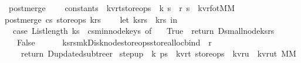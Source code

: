 \begin{isabellebody}
\isanewline
\isanewline
\isanewline
\isanewline
\isanewline
\isanewline
\isanewline
\isanewline
\isanewline
\isanewline
\isanewline
\isanewline
{}\isamarkupfalse%
\ post{\isacharunderscore}merge\ {\isacharcolon}{\isacharcolon}\ \isanewline
\ \ {\isachardoublequoteopen}constants\ {\isasymRightarrow}\ {\isacharparenleft}{\isacharprime}k{\isacharcomma}{\isacharprime}v{\isacharcomma}{\isacharprime}r{\isacharcomma}{\isacharprime}t{\isacharparenright}store{\isacharunderscore}ops\ {\isasymRightarrow}\ {\isacharparenleft}{\isacharprime}k\ s\ {\isacharasterisk}\ {\isacharprime}r\ s{\isacharparenright}\ {\isasymRightarrow}\ {\isacharparenleft}{\isacharparenleft}{\isacharprime}k{\isacharcomma}{\isacharprime}v{\isacharcomma}{\isacharprime}r{\isacharparenright}fo{\isacharcomma}{\isacharprime}t{\isacharparenright}MM{\isachardoublequoteclose}\isanewline
{}\isanewline
{\isachardoublequoteopen}post{\isacharunderscore}merge\ cs\ store{\isacharunderscore}ops\ krs\ {\isacharequal}\ {\isacharparenleft}\isanewline
\ \ let\ {\isacharparenleft}ks{\isacharcomma}rs{\isacharparenright}\ {\isacharequal}\ krs\ in\isanewline
\ \ case\ List{\isachardot}length\ ks\ {\isacharless}\ cs{\isacharbar}{\isachargreater}min{\isacharunderscore}node{\isacharunderscore}keys\ of\ \isanewline
\ \ True\ {\isasymRightarrow}\ {\isacharparenleft}return\ {\isacharparenleft}D{\isacharunderscore}small{\isacharunderscore}node{\isacharparenleft}ks{\isacharcomma}rs{\isacharparenright}{\isacharparenright}{\isacharparenright}\isanewline
\ \ {\isacharbar}\ False\ {\isasymRightarrow}\ {\isacharparenleft}\isanewline
\ \ \ \ {\isacharparenleft}ks{\isacharcomma}rs{\isacharparenright}{\isacharbar}{\isachargreater}mk{\isacharunderscore}Disk{\isacharunderscore}node{\isacharbar}{\isachargreater}{\isacharparenleft}store{\isacharunderscore}ops{\isacharbar}{\isachargreater}store{\isacharunderscore}alloc{\isacharparenright}{\isacharbar}{\isachargreater}bind\ {\isacharparenleft}{\isacharpercent}\ r{\isachardot}\isanewline
\ \ \ \ return\ {\isacharparenleft}D{\isacharunderscore}updated{\isacharunderscore}subtree{\isacharparenleft}r{\isacharparenright}{\isacharparenright}{\isacharparenright}{\isacharparenright}{\isacharparenright}{\isachardoublequoteclose}\isanewline
\isanewline
\isanewline
{}\isamarkupfalse%
\ step{\isacharunderscore}up\ {\isacharcolon}{\isacharcolon}\ {\isachardoublequoteopen}{\isacharprime}k\ ps{}\ {\isasymRightarrow}\ {\isacharparenleft}{\isacharprime}k{\isacharcomma}{\isacharprime}v{\isacharcomma}{\isacharprime}r{\isacharcomma}{\isacharprime}t{\isacharparenright}\ store{\isacharunderscore}ops\ {\isasymRightarrow}\ {\isacharparenleft}{\isacharprime}k{\isacharcomma}{\isacharprime}v{\isacharcomma}{\isacharprime}r{\isacharparenright}u\ {\isasymRightarrow}\ {\isacharparenleft}{\isacharparenleft}{\isacharprime}k{\isacharcomma}{\isacharprime}v{\isacharcomma}{\isacharprime}r{\isacharparenright}u{\isacharcomma}{\isacharprime}t{\isacharparenright}\ MM{\isachardoublequoteclose}\ \isanewline

\end{isabellebody}
